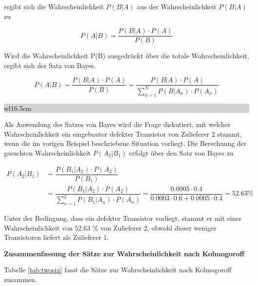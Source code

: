 \noindent ergibt sich die Wahrscheinlichkeit $P(B|A)$ aus der Wahrscheinlichkeit $P(B|A)$ zu

\begin{equation}\label{eq:twoeightytwo}
P(A|B)=\dfrac{P(B|A)\cdot P(A)}{P(B)}
\end{equation}

\noindent Wird die Wahrscheinlichkeit P(B) ausgedr\"{u}ckt \"{u}ber die totale Wahrscheinlichkeit, ergibt sich der Satz von Bayes. 

\begin{equation}\label{eq:twoeightythree}
P(A|B)=\dfrac{P(B|A)\cdot P(A)}{P(B)} =\dfrac{P(B|A)\cdot P(A)}{\sum _{n=1}^{N}P(B|A_{n}) \cdot P(A_{n})}
\end{equation}

\noindent
\colorbox{lightgray}{%
%
\renewcommand\arraystretch{0.6}%
\begin{tabular}{ wl{16.5cm} }
{\selectfont
{}}
\end{tabular}%
}\bigskip

\noindent Als Anwendung des Satzes von Bayes wird die Frage diskutiert, mit welcher Wahrscheinlichkeit ein eingebauter defekter Transistor von Zulieferer 2 stammt, wenn die im vorigen Beispiel beschriebene Situation vorliegt. Die Berechnung der gesuchten Wahrscheinlichkeit $P(A{}_{2}|B{}_{1})$ erfolgt \"{u}ber den Satz von Bayes zu

\begin{equation}\label{eq:twoeightyfour}
\begin{split}
P(A_{2} |B_{1} ) & =\dfrac{P(B_{1} |A_{2} )\cdot P(A_{2} )}{P(B_{1} )} \\ 
& =\dfrac{P(B_{1} |A_{2})\cdot P(A_{2})}{\sum _{n=1}^{2}P(B_{1} |A_{n} ) \cdot P(A_{n})} =\dfrac{0.0005\cdot 0.4}{0.0003\cdot 0.6+0.0005\cdot 0.4}=52.63 \%
\end{split}
\end{equation}

\noindent Unter der Bedingung, dass ein defekter Transistor vorliegt, stammt er mit einer Wahrscheinlichkeit von 52.63 \% von Zulieferer 2, obwohl dieser weniger Transistoren liefert als Zulieferer 1.\bigskip

{\selectfont
\noindent\textbf{Zusammenfassung der S\"{a}tze zur Wahrscheinlichkeit nach Kolmogoroff}} \smallskip

\noindent Tabelle \ref{tab:twosix} fasst die S\"{a}tze zur Wahrscheinlichkeit nach Kolmogoroff zusammen.

